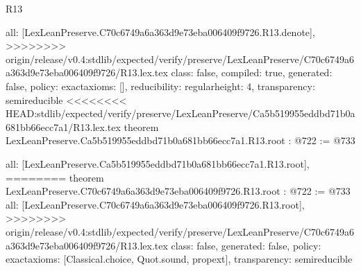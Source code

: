 \begin{lexlean}{R13}
\begin{coremodule}
{{{{{{{{{  all: [LexLeanPreserve.C70c6749a6a363d9e73eba006409f9726.R13.denote],
>>>>>>>> origin/release/v0.4:stdlib/expected/verify/preserve/LexLeanPreserve/C70c6749a6a363d9e73eba006409f9726/R13.lex.tex
  class: false,
  compiled: true,
  generated: false,
  policy: exact{axioms: []},
  reducibility: regular{height: 4},
  transparency: semireducible
}
<<<<<<<< HEAD:stdlib/expected/verify/preserve/LexLeanPreserve/Ca5b519955eddbd71b0a681bb66ecc7a1/R13.lex.tex
theorem LexLeanPreserve.Ca5b519955eddbd71b0a681bb66ecc7a1.R13.root : @722 := @733 {
  all: [LexLeanPreserve.Ca5b519955eddbd71b0a681bb66ecc7a1.R13.root],
========
theorem LexLeanPreserve.C70c6749a6a363d9e73eba006409f9726.R13.root : @722 := @733 {
  all: [LexLeanPreserve.C70c6749a6a363d9e73eba006409f9726.R13.root],
>>>>>>>> origin/release/v0.4:stdlib/expected/verify/preserve/LexLeanPreserve/C70c6749a6a363d9e73eba006409f9726/R13.lex.tex
  class: false,
  generated: false,
  policy: exact{axioms: [Classical.choice, Quot.sound, propext]},
  transparency: semireducible
}

}}}}}}}}}
\end{coremodule}
\end{lexlean}
